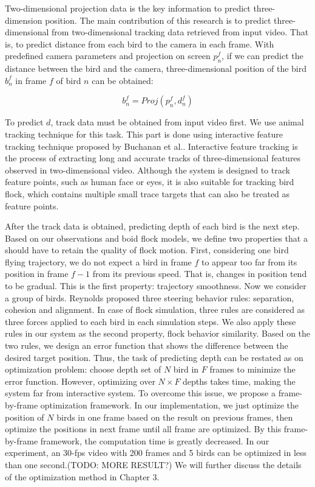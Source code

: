 Two-dimensional projection data is the key information to predict three-dimension position. The main contribution of this research is to predict three-dimensional from two-dimensional tracking data retrieved from input video. That is, to predict distance from each bird to the camera in each frame. With predefined camera parameters and projection on screen $p_n^f$, if we can predict the distance between the bird and the camera, three-dimensional position of the bird $b_n^f$ in frame $f$ of bird $n$ can be obtained:


\begin{equation}\label{eq:projection}
 b_n^f=Proj(p_n^f,d_n^f)
\end{equation}


To predict $d$, track data must be obtained from input video first. We use animal tracking technique for this task. This part is done using interactive feature tracking technique proposed by Buchanan et al.\cite{Tracking}. Interactive feature tracking is the process of extracting long and accurate tracks of three-dimensional features observed in two-dimensional video. Although the system is designed to track feature points, such as human face or eyes, it is also suitable for tracking bird flock, which contains multiple small trace targets that can also be treated as feature points.



After the track data is obtained, predicting depth of each bird is the next step. Based on our observations and boid flock models, we define two properties that a should have to retain the quality of flock motion. First, considering one bird flying trajectory, we do not expect a bird in frame $f$ to appear too far from its position in frame $f-1$ from its previous speed. That is, changes in position tend to be gradual. This is the first property: trajectory smoothness. Now we consider a group of birds. Reynolds proposed three steering behavior rules: separation, cohesion and alignment\cite{Boid}. In case of flock simulation, three rules are considered as three forces applied to each bird in each simulation steps. We also apply these rules in our system as the second property, flock behavior similarity. Based on the two rules, we design an error function that shows the difference between the desired target position. Thus, the task of predicting depth can be restated as on optimization problem: choose depth set of $N$ bird in $F$ frames to minimize the error function. However, optimizing over $N×F$ depths takes time, making the system far from interactive system. To overcome this issue, we propose a frame-by-frame optimization framework. In our implementation, we just optimize the position of $N$ birds in one frame based on the result on previous frames, then optimize the positions in next frame until all frame are optimized. By this frame-by-frame framework, the computation time is greatly decreased. In our experiment, an 30-fps video with 200 frames and 5 birds can be optimized in less than one second.(TODO: MORE RESULT?) We will further discuss the details of the optimization method in Chapter 3.


